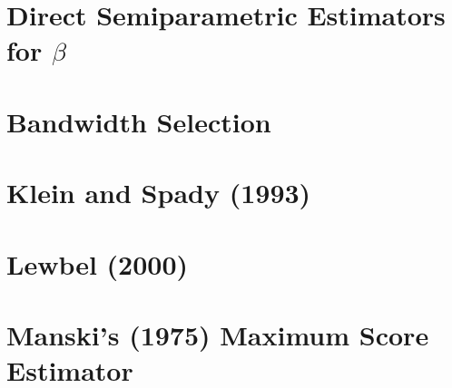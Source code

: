 \documentclass[xcolor=svgnames,dvipdfmx,cjk]{beamer}
\theoremstyle{example}
\begin{document}
\section{Direct Semiparametric Estimators for $\beta$}
\begin{frame}
  \tableofcontents[currentsection]
\end{frame}









\section{Bandwidth Selection}
\begin{frame}
  \tableofcontents[currentsection]
\end{frame}









\section{Klein and Spady (1993)}
\begin{frame}
  \tableofcontents[currentsection]
\end{frame}









\section{Lewbel (2000)}
\begin{frame}
  \tableofcontents[currentsection]
\end{frame}









\section{Manski's (1975) Maximum Score Estimator}
\begin{frame}
  \tableofcontents[currentsection]
\end{frame}
\end{document}
